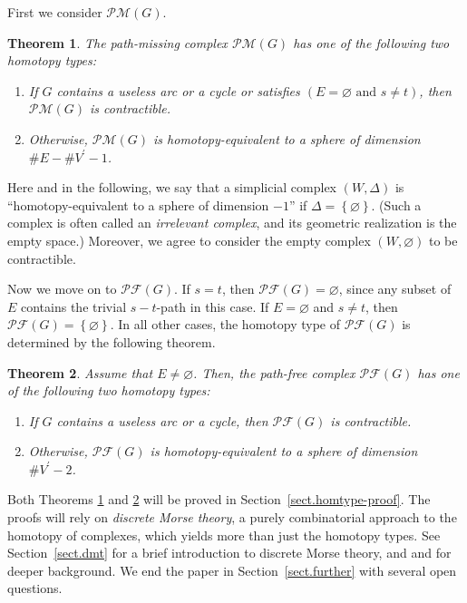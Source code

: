\documentclass[12pt]{amsart}
\newtheorem{theorem}{Theorem}[section]
\theoremstyle{definition}
\newcommand{\set}[1]{\left\{ #1 \right\}}
\newcommand{\tup}[1]{\left( #1 \right)}
\newcommand{\Pm}[1]{\mathcal{PM}\left(#1\right)}
\newcommand{\Pf}[1]{\mathcal{PF}\left(#1\right)}
\newcommand{\NS}{V^{\prime}}
\begin{document}
First we consider $\Pm{G}$.

\begin{theorem} \label{thm.PM.homotopy}
	The path-missing complex $\Pm{G}$ has one of the following two homotopy types:
	\begin{enumerate}
		\item[(a)] If $G$ contains a useless arc or a cycle or satisfies $\tup{E = \varnothing \text{ and } s \neq t}$, then $\Pm{G}$ is contractible.
		\item[(b)] Otherwise, $\Pm{G}$ is homotopy-equivalent to a sphere of dimension $\#E - \# \NS - 1$.
	\end{enumerate}
\end{theorem}

Here and in the following, we say that a simplicial complex $\tup{W, \Delta}$ is ``homotopy-equivalent to a sphere of dimension $-1$'' if $\Delta = \set{\varnothing}$. (Such a complex is often called an \emph{irrelevant complex}, and its geometric realization is the empty space.)
Moreover, we agree to consider the empty complex $\tup{W, \varnothing}$ to be contractible.

Now we move on to $\Pf{G}$. If $s = t$, then $\Pf{G} = \varnothing$, since any subset of $E$ contains the trivial $s-t$-path in this case. If $E = \varnothing$ and $s \neq t$, then $\Pf{G} = \set{\varnothing}$. In all other cases, the homotopy type of $\Pf{G}$ is determined by the following theorem.

\begin{theorem} \label{thm.PF.homotopy}
    Assume that $E \neq \varnothing$. Then, the path-free complex $\Pf{G}$ has one of the following two homotopy types:
    \begin{enumerate}
        \item[(a)] If $G$ contains a useless arc or a cycle, then $\Pf{G}$ is contractible.
        \item[(b)] Otherwise, $\Pf{G}$ is homotopy-equivalent to a sphere of dimension $\#\NS - 2$.
    \end{enumerate}
\end{theorem}

Both Theorems \ref{thm.PM.homotopy} and \ref{thm.PF.homotopy} will be proved in Section~\ref{sect.homtype-proof}.
The proofs will rely on \emph{discrete Morse theory}, a purely combinatorial approach to the homotopy of complexes, which yields more than just the homotopy types.
See Section~\ref{sect.dmt} for a brief introduction to discrete Morse theory, and \cite{Kozlov20} and \cite{Forman-user} for deeper background.  We end the paper in Section~\ref{sect.further} with several open questions.
\end{document}
